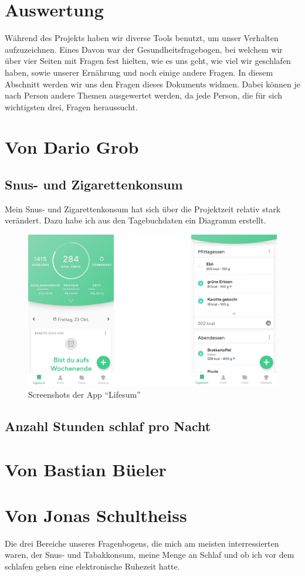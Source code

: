 \section{Auswertung}
Während des Projekts haben wir diverse Tools benutzt, um unser Verhalten aufzuzeichnen. Eines Davon war der Gesundheitsfragebogen, bei welchem wir über vier Seiten mit Fragen fest hielten, wie es uns geht, wie viel wir geschlafen haben, sowie unserer Ernährung und noch einige andere Fragen. In diesem Abschnitt werden wir uns den Fragen dieses Dokuments widmen. Dabei können je nach Person andere Themen ausgewertet werden, da jede Person, die für sich wichtigsten drei, Fragen heraussucht.
\section{Von Dario Grob}
\subsection{Snus- und Zigarettenkonsum}
Mein Snus- und Zigarettenkonsum hat sich über die Projektzeit relativ stark verändert. Dazu habe ich aus den Tagebuchdaten ein Diagramm erstellt.
\begin{figure}[!ht]
  \centering
  \includegraphics[width=0.7\linewidth]{./images/app.png}
  \caption{Screenshots der App “Lifesum”}
  \label{fig:app_1}
\end{figure}
\subsection{Anzahl Stunden schlaf pro Nacht}
\section{Von Bastian Büeler}
\section{Von Jonas Schultheiss}
Die drei Bereiche unseres Fragenbogens, die mich am meisten interressierten waren, der Snus- und Tabakkonsum, meine Menge an Schlaf und ob ich vor dem schlafen gehen eine elektronische Ruhezeit hatte.
